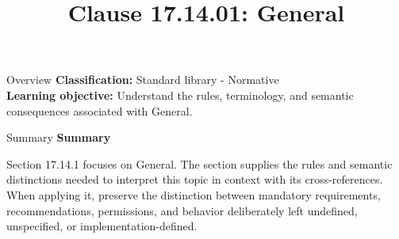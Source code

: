 \documentclass[10pt,letterpaper]{article}
\title{Clause 17.14.01: General}
\author{}
\date{}
\begin{document}
\maketitle
\begin{CornellOverviewBox}{Overview}
\textbf{Classification:} Standard library - Normative\\[2pt]
\textbf{Learning objective:} Understand the rules, terminology, and semantic consequences associated with General.
\end{CornellOverviewBox}\begin{CornellSummaryBox}{Summary}
{\sffamily\bfseries\color{Accent} Summary}\par\vspace{3pt}Section 17.14.1 focuses on General. The section supplies the rules and semantic distinctions needed to interpret this topic in context with its cross-references. When applying it, preserve the distinction between mandatory requirements, recommendations, permissions, and behavior deliberately left undefined, unspecified, or implementation-defined.
\end{CornellSummaryBox}
\end{document}
